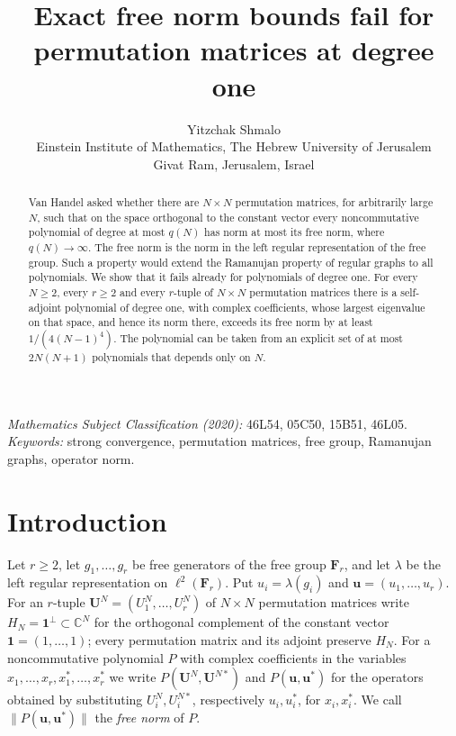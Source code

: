 \documentclass[11pt]{article}
\title{Exact free norm bounds fail for permutation matrices at degree one}
\author{Yitzchak Shmalo\\
Einstein Institute of Mathematics, The Hebrew University of Jerusalem\\
Givat Ram, Jerusalem, Israel}
\date{}
\theoremstyle{remark}
\newcommand{\one}{\mathbf 1}
\begin{document}
\maketitle

\begin{abstract}
Van Handel asked whether there are $N\times N$ permutation matrices, for arbitrarily large $N$, such that on the
space orthogonal to the constant vector every noncommutative polynomial of degree at most $q(N)$ has norm at most its
free norm, where $q(N)\to\infty$. The free norm is the norm in the left regular representation of the free group.
Such a
property would extend the Ramanujan property of regular graphs to all polynomials. We show that it fails already for
polynomials of degree one. For every $N\ge 2$, every $r\ge 2$ and every $r$-tuple of $N\times N$ permutation
matrices there is a self-adjoint polynomial of degree one, with complex coefficients, whose largest eigenvalue on
that space, and hence its norm there, exceeds its free norm by at least $1/(4(N-1)^4)$. The polynomial can be taken
from an explicit set of at most $2N(N+1)$ polynomials that depends only on $N$.
\end{abstract}

\noindent\textit{Mathematics Subject Classification (2020):} 46L54, 05C50, 15B51, 46L05.\\
\textit{Keywords:} strong convergence, permutation matrices, free group, Ramanujan graphs, operator norm.

\section{Introduction}\label{sec:intro}

Let $r\ge 2$, let $g_1,\dots,g_r$ be free generators of the free group $\mathbf F_r$, and let $\lambda$ be the left regular
representation on $\ell^2(\mathbf F_r)$. Put $u_i=\lambda(g_i)$ and $\mathbf u=(u_1,\dots,u_r)$. For an $r$-tuple
$\mathbf U^N=(U_1^N,\dots,U_r^N)$ of $N\times N$ permutation matrices write $H_N=\one^\perp\subset\mathbb C^N$ for
the orthogonal complement of the constant vector $\one=(1,\dots,1)$; every permutation matrix and its adjoint preserve $H_N$. For a
noncommutative polynomial $P$ with complex coefficients in the variables $x_1,\dots,x_r,x_1^*,\dots,x_r^*$ we write
$P(\mathbf U^N,\mathbf U^{N*})$ and $P(\mathbf u,\mathbf u^*)$ for the operators obtained by substituting
$U_i^N,U_i^{N*}$, respectively $u_i,u_i^*$, for $x_i,x_i^*$. We call $\|P(\mathbf u,\mathbf u^*)\|$ the \emph{free
norm} of $P$.
\end{document}
